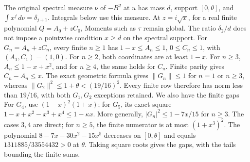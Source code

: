 The original spectral measure \(\nu\) of \(-B^2\) at \(u\) has mass \(d\),
support \([0,\allowbreak \theta]\), and \(\int x^j\,\allowbreak d\nu=\delta_{j+1}\).
Integrals below use this measure. At \(z=i\sqrt x\), for a real finite
polynomial \(Q=A_0+zC_0\),
Moments such as \(\tau\) remain global. The ratio \(\delta_2/d\) does not impose a pointwise condition \(x\ge d\) on the spectral support.
For \(G_n=A_n+zC_n\), every finite \(n\ge1\) has
\(1-x\le A_n\le1\), \(0\le C_n\le1\), with \((A_1,\allowbreak C_1)=(1,\allowbreak 0)\).
For \(n\ge2\), both coordinates are at least \(1-x\). For \(n\ge3\),
\(A_n\le1-x+x^2\), and for \(n\ge4\), the same holds for \(C_n\).
Finite parity gives \(C_n-A_n\le x\). The exact geometric formula gives
\(\lVert G_n\rVert\le1\) for \(n=1\) or \(n\ge3\), whereas
\(\lVert G_2\rVert^2\le1+\theta<(19/16)^2\). Every finite row therefore
has norm less than \(19/16\), with both \(G_1,\allowbreak G_2\) exceptions retained.
We also have the finite gaps
For \(G_4\), use \((1-x)^2(1+x)\); for \(G_5\), its exact square
\(1-x+x^2-x^3+x^4\le1-\kappa x\). More generally,
\(|G_n|^2\le1-7x/15\) for \(n\ge3\). The cases \(3,\allowbreak 4\) are direct;
for \(n\ge5\), the finite numerator is at most \((1+x^3)^2\).
The polynomial \(8-7x-30x^2-15x^5\) decreases on \([0,\allowbreak \theta]\) and
equals \(1311885/33554432>0\) at \(\theta\). Taking square roots gives
the gaps, with the tails bounding the finite sums.

